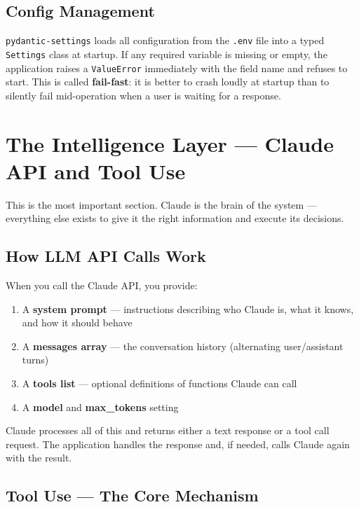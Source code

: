 \documentclass[12pt, a4paper]{article}
\begin{document}
\subsection{Config Management}

\texttt{pydantic-settings} loads all configuration from the \texttt{.env} file into a typed \texttt{Settings} class at startup. If any required variable is missing or empty, the application raises a \texttt{ValueError} immediately with the field name and refuses to start. This is called \textbf{fail-fast}: it is better to crash loudly at startup than to silently fail mid-operation when a user is waiting for a response.

\section{The Intelligence Layer --- Claude API and Tool Use}

This is the most important section. Claude is the brain of the system --- everything else exists to give it the right information and execute its decisions.

\subsection{How LLM API Calls Work}

When you call the Claude API, you provide:
\begin{enumerate}[noitemsep]
    \item A \textbf{system prompt} --- instructions describing who Claude is, what it knows, and how it should behave
    \item A \textbf{messages array} --- the conversation history (alternating user/assistant turns)
    \item A \textbf{tools list} --- optional definitions of functions Claude can call
    \item A \textbf{model} and \textbf{max\_tokens} setting
\end{enumerate}

Claude processes all of this and returns either a text response or a tool call request. The application handles the response and, if needed, calls Claude again with the result.

\subsection{Tool Use --- The Core Mechanism}
\end{document}
